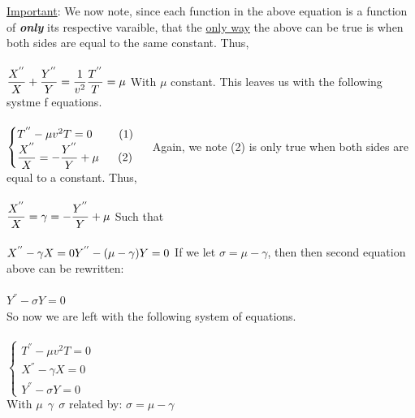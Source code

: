 \documentclass[fleqn]{article}
\begin{document}
\begin{enumerate}
\begin{enumerate}
      \textcolor{hwColor}{
        \underline{Important}: We now note, since each function in the above equation is a function of \textbf{\textit{only}} its respective varaible,
        that the \underline{only way} the above can be true is when both sides are equal to the same constant. Thus, \\
        \\
        $
          \dfrac{X^{''}}{X}+\dfrac{Y^{''}}{Y}=\dfrac{1}{v^2}\dfrac{T^{''}}{T}=\mu \\
          \\
        $
        With $\mu$ constant. This leaves us with the following systme f equations. \\
        \\
        $
          \begin{cases}
            T^{''}-\mu v^2 T=0 ~~~~~~~ (1) \\
            \dfrac{X^{''}}{X}=-\dfrac{Y^{''}}{Y}+\mu ~~~~~ (2)
          \end{cases} \\
          \\
        $
        Again, we note (2) is only true when both sides are equal to a constant. Thus, \\
        \\
        $
          \dfrac{X^{''}}{X}=\gamma=-\dfrac{Y^{''}}{Y}+\mu \\
          \\
        $
        Such that \\
        \\
        $
          X^{''}-\gamma X=0 \\
          Y^{''}-(\mu-\gamma)Y=0 \\
          \\
        $
        If we let $\sigma=\mu-\gamma$, then then second equation above can be rewritten: \\
        \\
        $
          Y^{''}-\sigma Y=0
        $ \\
        So now we are left with the following system of equations. \\
        \\
        $
          \begin{cases}
            T^{''}-\mu v^2 T=0 \\
            X^{''}- \gamma X=0 \\
            Y^{''}-\sigma Y=0
          \end{cases}
        $ \\
        With $\mu ~~ \gamma ~~ \sigma$ related by: $\sigma=\mu-\gamma$ \\
      }


\end{enumerate}
\end{enumerate}
\end{document}
